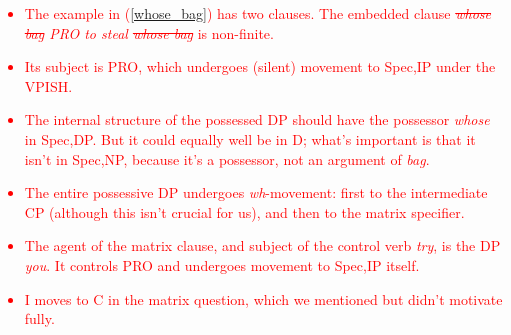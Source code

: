 \documentclass{article}
\begin{document}
\textcolor{red}{
\begin{itemize}
    \item The example in (\ref{whose_bag}) has two clauses. The embedded clause \emph{\sout{whose bag} PRO to steal \emph{\sout{whose bag}}} is non-finite.
    \item Its subject is PRO, which undergoes (silent) movement to Spec,IP under the VPISH.
    \item The internal structure of the possessed DP should have the possessor \emph{whose} in Spec,DP. But it could equally well be in D; what's important is that it isn't in Spec,NP, because it's a possessor, not an argument of \emph{bag}.
    \item The entire possessive DP undergoes \emph{wh}-movement: first to the intermediate CP (although this isn't crucial for us), and then to the matrix specifier.
    \item The agent of the matrix clause, and subject of the control verb \emph{try}, is the DP \emph{you}. It controls PRO and undergoes movement to Spec,IP itself.
    \item I moves to C in the matrix question, which we mentioned but didn't motivate fully.
\end{itemize}
}
\end{document}
